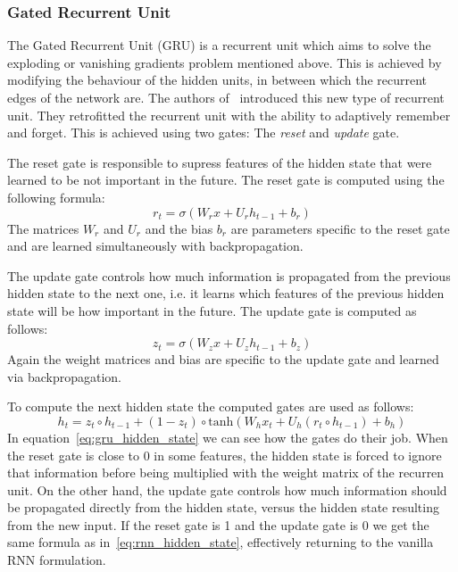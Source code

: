 \subsubsection{Gated Recurrent Unit}\label{sec:gru}
The Gated Recurrent Unit (GRU) is a recurrent unit which aims to solve the exploding or vanishing gradients problem mentioned above.
This is achieved by modifying the behaviour of the hidden units, in between which the recurrent edges of the network are.
The authors of~\cite{gru} introduced this new type of recurrent unit.
They retrofitted the recurrent unit with the ability to adaptively remember and forget.
This is achieved using two gates: The \emph{reset} and \emph{update} gate.
\par
The reset gate is responsible to supress features of the hidden state that were learned to be not important in the future.
The reset gate is computed using the following formula:
\begin{equation}\label{eq:gru_reset_gate}
    r_t = \sigma( W_rx + U_rh_{t-1} + b_r)
\end{equation}
The matrices $W_r$ and $U_r$ and the bias $b_r$ are parameters specific to the reset gate and are learned simultaneously with backpropagation.
\par
The update gate controls how much information is propagated from the previous hidden state to the next one, i.e. it learns which features of the previous hidden state will be how important in the future.
The update gate is computed as follows:
\begin{equation}\label{eq:gru_update_gate}
    z_t = \sigma( W_zx + U_zh_{t-1} + b_z)
\end{equation}
Again the weight matrices and bias are specific to the update gate and learned via backpropagation.
\par
To compute the next hidden state the computed gates are used as follows:
\begin{equation}\label{eq:gru_hidden_state}
    h_t = z_t \circ h_{t-1} + (1 - z_t) \circ \text{tanh}(W_hx_t + U_h(r_t \circ h_{t-1}) + b_h)
\end{equation}
In equation~\ref{eq:gru_hidden_state} we can see how the gates do their job.
When the reset gate is close to 0 in some features, the hidden state is forced to ignore that information before being multiplied with the weight matrix of the recurren unit.
On the other hand, the update gate controls how much information should be propagated directly from the hidden state, versus the hidden state resulting from the new input.
If the reset gate is 1 and the update gate is 0 we get the same formula as in~\ref{eq:rnn_hidden_state}, effectively returning to the vanilla RNN formulation.
